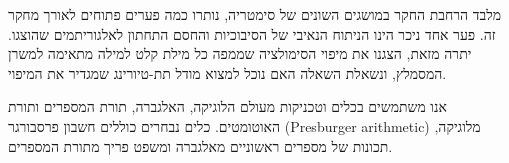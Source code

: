 {מלבד הרחבת החקר במושגים השונים של סימטריה,
נותרו כמה פערים פתוחים לאורך מחקר זה.
פער אחד ניכר הינו הניתוח הנאיבי של הסיבוכיות והחסם התחתון לאלגוריתמים שהוצגו.
יתרה מזאת, 
הצגנו את מיפוי הסימולציה שממפה כל מילת קלט למילה מתאימה למשרן המסמלץ, ונשאלת השאלה האם נוכל למצוא מודל תת-טיורינג שמגדיר את המיפוי.

אנו משתמשים בכלים וטכניקות מעולם הלוגיקה, האלגברה, תורת המספרים ותורת האוטומטים. כלים נבחרים כוללים חשבון פרסבורגר
(\textenglish{Presburger arithmetic})
מלוגיקה, תכונות של מספרים ראשוניים מאלגברה ומשפט פריך מתורת המספרים.








}
